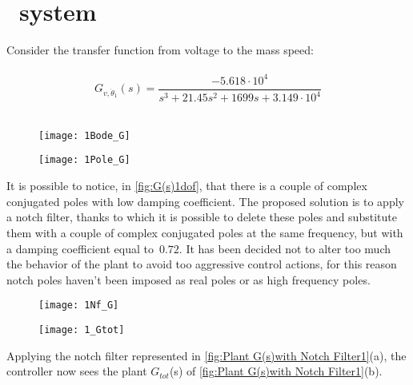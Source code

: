 \label{sec:FD_control}
\section{\onedof\ system}
Consider the transfer function from voltage to the mass speed:\\
\\
\[	
G_{v, \dot \theta_1}(s)=
\frac{-5.618 \cdot 10^{4}}{{s^3 + 21.45 s^{2}}+1699 s+3.149 \cdot 10^{4}}
\]
\\

\begin{figure*}[h]
	\centering
	\begin{subfigure}{0.55\columnwidth}
		\texttt{[image: 1Bode\_G]}
	\end{subfigure}
	\begin{subfigure}{0.4\columnwidth}
		\texttt{[image: 1Pole\_G]}
	\end{subfigure}
	\caption{$G_{v, \dot \theta_1}(s)$}
	\label{fig:G(s)1dof}
\end{figure*}

It is possible to notice, in \cref{fig:G(s)1dof}, that there is a couple of complex conjugated poles with low damping coefficient. The proposed solution is to apply a notch filter, thanks to which it is possible to delete these poles and substitute them with a couple of complex conjugated poles at the same frequency, but with a damping coefficient equal to~$0.72$. It has been decided not to alter too much the behavior of the plant to avoid too aggressive control actions, for this reason notch poles haven't been imposed as real poles or as high frequency poles.

\begin{figure*}[h]
	\centering
	\begin{subfigure}{0.47\columnwidth}
		\texttt{[image: 1Nf\_G]}
	\end{subfigure}
	\begin{subfigure}{0.47\columnwidth}
		\texttt{[image: 1\_Gtot]}
	\end{subfigure}
	\caption{Plant $G(s)$ with Notch Filter $N_f(s)$: $G_{tot}(s)$}
	\label{fig:Plant G(s)with Notch Filter1}
\end{figure*}


Applying the notch filter represented in \cref{fig:Plant G(s)with Notch Filter1}(a), the controller now sees the plant $G_{tot}$(s) of \cref{fig:Plant G(s)with Notch Filter1}(b).

